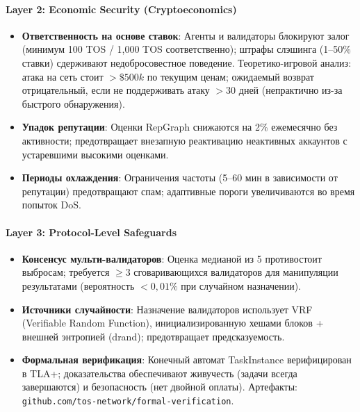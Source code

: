 \documentclass[11pt]{article}
\begin{document}
\paragraph{Layer 2: Economic Security (Cryptoeconomics)}
\begin{itemize}[noitemsep]
  \item \textbf{Ответственность на основе ставок}: Агенты и валидаторы блокируют залог (минимум 100 TOS / 1{,}000 TOS соответственно); штрафы слэшинга (1--50\% ставки) сдерживают недобросовестное поведение. Теоретико-игровой анализ: атака на сеть стоит $>\$500k$ по текущим ценам; ожидаемый возврат отрицательный, если не поддерживать атаку $>30$ дней (непрактично из-за быстрого обнаружения).
  \item \textbf{Упадок репутации}: Оценки RepGraph снижаются на 2\% ежемесячно без активности; предотвращает внезапную реактивацию неактивных аккаунтов с устаревшими высокими оценками.
  \item \textbf{Периоды охлаждения}: Ограничения частоты (5--60 мин в зависимости от репутации) предотвращают спам; адаптивные пороги увеличиваются во время попыток DoS.
\end{itemize}

\paragraph{Layer 3: Protocol-Level Safeguards}
\begin{itemize}[noitemsep]
  \item \textbf{Консенсус мульти-валидаторов}: Оценка медианой из 5 противостоит выбросам; требуется $\geq3$ сговаривающихся валидаторов для манипуляции результатами (вероятность $<0,01\%$ при случайном назначении).
  \item \textbf{Источники случайности}: Назначение валидаторов использует VRF (Verifiable Random Function), инициализированную хешами блоков + внешней энтропией (drand); предотвращает предсказуемость.
  \item \textbf{Формальная верификация}: Конечный автомат TaskInstance верифицирован в TLA+; доказательства обеспечивают живучесть (задачи всегда завершаются) и безопасность (нет двойной оплаты). Артефакты: \texttt{github.com/tos-network/formal-verification}.
\end{itemize}
\end{document}
